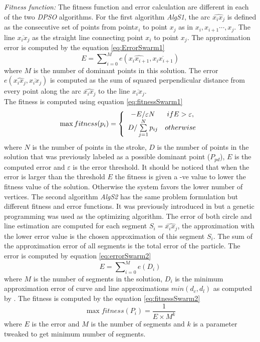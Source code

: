\documentclass{article}%
\begin{document}
\textsl{Fitness function:} The fitness function and error calculation are different in each of the two \textit{DPSO} algorithms. For the first algorithm \textsl{AlgS1}, 
 the arc $\widehat{x_ix_j}$ is defined as the consecutive set of points from point$x_i$ to point $x_{j}$ as in $x_i,x_{i+1} \cdots,x_j$. The line $\overline{x_i x_j} $ as the straight line connecting point $x_i$ to point $x_j$. The approximation error is computed by the equation \ref{eq:ErrorSwarm1}
\begin{equation}
E=\sum\nolimits_{i = 0}^M e ( \widehat{x_ix_{i+1}},\overline{x_i x_{i+1}})
\label{eq:ErrorSwarm1}
\end{equation} where $M$ is the number of dominant points in this solution. The error $e ( \widehat{x_ix_j},\overline{x_i x_j})$ is computed as the sum of squared perpendicular distance from every point along the arc $\widehat{x_ix_j}$ to the line $\overline{x_i x_j}$.  \\
The fitness is computed using equation \ref{eq:fitnessSwarm1}\begin{equation}
\max fitness(p_i ) = \left\{ {\begin{array}{*{20}c}
   { - E/\varepsilon N} & {ifE > \varepsilon ,}  \\
   {D/\sum\limits_{j = 1}^N {p_{ij} } } & {otherwise}  \\
\end{array}} \right.
\label{eq:fitnessSwarm1}
\end{equation} where $N$ is the number of points in the stroke, $D$ is the number of points in the solution that was previously labeled as a possible dominant point ($P_{pd}$), $E$ is the computed error and $\varepsilon$ is the error threshold. It should be noticed that when the error is larger than the threshold $E$ the fitness is given a -ve value to lower the fitness value of the solution. Otherwise the system favors the lower number of vertices.
The second algorithm \textsl{AlgS2} has the same problem formulation but different fitness and error functions. It was previously introduced in \cite{CruveDivisionSwarm} but a genetic programming was used as the optimizing algorithm.  The error of both circle and line estimation are computed for each segment $S_i=\widehat{x_ix_j}$, the approximation with the lower error value is the chosen approximation of this segment $S_i$. The sum of the approximation error of all segments is the total error of the particle.  The error is computed by equation \ref{eq:errorSwarm2} \begin{equation}
E=\sum\nolimits_{i = 0}^M e(D_i) 
\label{eq:errorSwarm2}
\end{equation}where $M$ is the number of segments in the solution, $D_i$ is the minimum approximation error of curve and line approximations $min(d_c,d_l)$ as computed by \cite{CruveDivisionSwarm}.  The fitness is computed by the equation \ref{eq:fitnessSwarm2} \begin{equation}
\max fitness(P_i ) = \frac{1}{{E \times M^k }}
\label{eq:fitnessSwarm2}
\end{equation} where $E$ is the error and $M$ is the number of segments and $k$ is a parameter tweaked to get minimum number of segments. 
\end{document}
